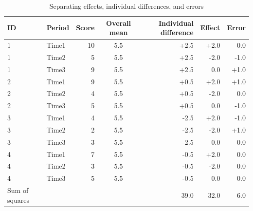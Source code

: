 \begin{table}[ht]
	\centering
	\caption{Separating effects, individual differences, and errors}
	\begin{tabular}{llrcrrr}
		\hline
		ID             & Period & Score & Overall mean & Individual difference & Effect & Error \\
		\hline
		1              & Time1  & 10    & 5.5          & +2.5                  & +2.0   & 0.0   \\
		1              & Time2  & 5     & 5.5          & +2.5                  & -2.0   & -1.0  \\
		1              & Time3  & 9     & 5.5          & +2.5                  & 0.0    & +1.0  \\
		2              & Time1  & 9     & 5.5          & +0.5                  & +2.0   & +1.0  \\
		2              & Time2  & 4     & 5.5          & +0.5                  & -2.0   & 0.0   \\
		2              & Time3  & 5     & 5.5          & +0.5                  & 0.0    & -1.0  \\
		3              & Time1  & 4     & 5.5          & -2.5                  & +2.0   & -1.0  \\
		3              & Time2  & 2     & 5.5          & -2.5                  & -2.0   & +1.0  \\
		3              & Time3  & 3     & 5.5          & -2.5                  & 0.0    & 0.0   \\
		4              & Time1  & 7     & 5.5          & -0.5                  & +2.0   & 0.0   \\
		4              & Time2  & 3     & 5.5          & -0.5                  & -2.0   & 0.0   \\
		4              & Time3  & 5     & 5.5          & -0.5                  & 0.0    & 0.0   \\
		\hline\hline
		Sum of squares &        &       &              & 39.0                  & 32.0   & 6.0   \\\hline
	\end{tabular}
	\label{tbl::22_07}
\end{table}
